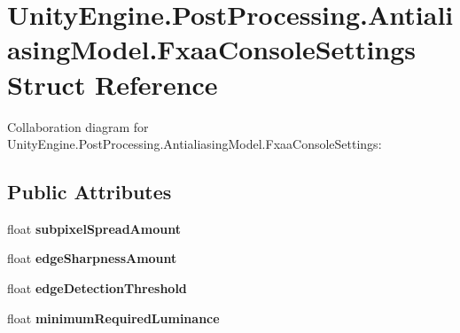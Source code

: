 \hypertarget{struct_unity_engine_1_1_post_processing_1_1_antialiasing_model_1_1_fxaa_console_settings}{}\section{Unity\+Engine.\+Post\+Processing.\+Antialiasing\+Model.\+Fxaa\+Console\+Settings Struct Reference}
\label{struct_unity_engine_1_1_post_processing_1_1_antialiasing_model_1_1_fxaa_console_settings}


Collaboration diagram for Unity\+Engine.\+Post\+Processing.\+Antialiasing\+Model.\+Fxaa\+Console\+Settings\+:
\subsection*{Public Attributes}
\begin{DoxyCompactItemize}
\item 
\mbox{\label{struct_unity_engine_1_1_post_processing_1_1_antialiasing_model_1_1_fxaa_console_settings_a62f92a7785b3852cd58a0b30388b5694}} 
float {\bfseries subpixel\+Spread\+Amount}
\item 
\mbox{\label{struct_unity_engine_1_1_post_processing_1_1_antialiasing_model_1_1_fxaa_console_settings_a936bf87fcddf7c1a744c14e58c8e3fec}} 
float {\bfseries edge\+Sharpness\+Amount}
\item 
\mbox{\label{struct_unity_engine_1_1_post_processing_1_1_antialiasing_model_1_1_fxaa_console_settings_aa2c6e96f122692f59b48a1259aab595d}} 
float {\bfseries edge\+Detection\+Threshold}
\item 
\mbox{\label{struct_unity_engine_1_1_post_processing_1_1_antialiasing_model_1_1_fxaa_console_settings_a1ab7378c63a8f03d5bca7e93ed6dcdf6}} 
float {\bfseries minimum\+Required\+Luminance}
\end{DoxyCompactItemize}
